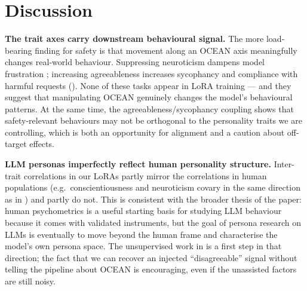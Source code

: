 \section{Discussion}\label{sec:discussion}

\textbf{The trait axes carry downstream behavioural signal.} The more load-bearing finding for safety is that movement along an OCEAN axis meaningfully changes real-world behaviour.
Suppressing neuroticism dampens model frustration \citep{soligo2026gemma}; increasing agreeableness increases sycophancy and compliance with harmful requests (). None of these tasks appear in LoRA training --- and they suggest that manipulating OCEAN genuinely changes the model's behavioural patterns.
At the same time, the agreeableness/sycophancy coupling shows that safety-relevant behaviours may not be orthogonal to the personality traits we are controlling, which is both an opportunity for alignment and a caution about off-target effects.

\textbf{LLM personas imperfectly reflect human personality structure.} Inter-trait correlations in our LoRAs partly mirror the correlations in human populations (e.g.\ conscientiousness and neuroticism covary in the same direction as in \citet{digman1990personality}) and partly do not.
This is consistent with the broader thesis of the paper: human psychometrics is a useful starting basis for studying LLM behaviour because it comes with validated instruments, but the goal of persona research on LLMs is eventually to move beyond the human frame and characterise the model's own persona space.
The unsupervised work in  is a first step in that direction; the fact that we can recover an injected ``disagreeable'' signal without telling the pipeline about OCEAN is encouraging, even if the unassisted factors are still noisy.

